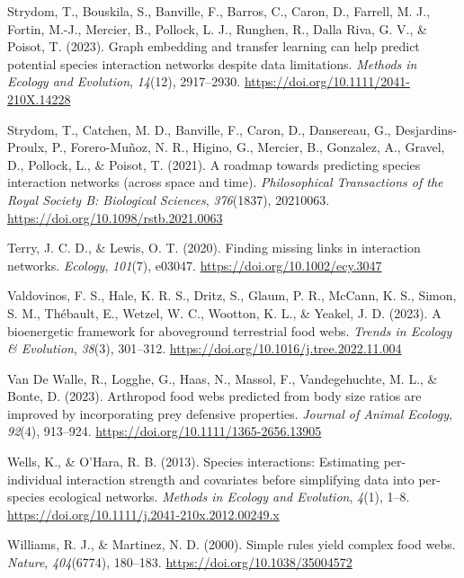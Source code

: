 \documentclass[
]{article}
\newlength{\cslhangindent}
\newenvironment{CSLReferences}[2] %
 {\begin{list}{}{%
  \setlength{\itemindent}{0pt}
  \setlength{\leftmargin}{0pt}
  \setlength{\parsep}{0pt}
  \ifodd #1
   \setlength{\leftmargin}{\cslhangindent}
   \setlength{\itemindent}{-1\cslhangindent}
  \fi
  \setlength{\itemsep}{#2\baselineskip}}}
 {\end{list}}
\begin{document}
\begin{CSLReferences}{1}{0}
Strydom, T., Bouskila, S., Banville, F., Barros, C., Caron, D., Farrell,
M. J., Fortin, M.-J., Mercier, B., Pollock, L. J., Runghen, R., Dalla
Riva, G. V., \& Poisot, T. (2023). Graph embedding and transfer learning
can help predict potential species interaction networks despite data
limitations. \emph{Methods in Ecology and Evolution}, \emph{14}(12),
2917--2930. \url{https://doi.org/10.1111/2041-210X.14228}

Strydom, T., Catchen, M. D., Banville, F., Caron, D., Dansereau, G.,
Desjardins-Proulx, P., Forero-Muñoz, N. R., Higino, G., Mercier, B.,
Gonzalez, A., Gravel, D., Pollock, L., \& Poisot, T. (2021). A roadmap
towards predicting species interaction networks (across space and time).
\emph{Philosophical Transactions of the Royal Society B: Biological
Sciences}, \emph{376}(1837), 20210063.
\url{https://doi.org/10.1098/rstb.2021.0063}

Terry, J. C. D., \& Lewis, O. T. (2020). Finding missing links in
interaction networks. \emph{Ecology}, \emph{101}(7), e03047.
\url{https://doi.org/10.1002/ecy.3047}

Valdovinos, F. S., Hale, K. R. S., Dritz, S., Glaum, P. R., McCann, K.
S., Simon, S. M., Thébault, E., Wetzel, W. C., Wootton, K. L., \&
Yeakel, J. D. (2023). A bioenergetic framework for aboveground
terrestrial food webs. \emph{Trends in Ecology \& Evolution},
\emph{38}(3), 301--312. \url{https://doi.org/10.1016/j.tree.2022.11.004}

Van De Walle, R., Logghe, G., Haas, N., Massol, F., Vandegehuchte, M.
L., \& Bonte, D. (2023). Arthropod food webs predicted from body size
ratios are improved by incorporating prey defensive properties.
\emph{Journal of Animal Ecology}, \emph{92}(4), 913--924.
\url{https://doi.org/10.1111/1365-2656.13905}

Wells, K., \& O'Hara, R. B. (2013). Species interactions: Estimating
per-individual interaction strength and covariates before simplifying
data into per-species ecological networks. \emph{Methods in Ecology and
Evolution}, \emph{4}(1), 1--8.
\url{https://doi.org/10.1111/j.2041-210x.2012.00249.x}

Williams, R. J., \& Martinez, N. D. (2000). Simple rules yield complex
food webs. \emph{Nature}, \emph{404}(6774), 180--183.
\url{https://doi.org/10.1038/35004572}


\end{CSLReferences}
\end{document}
